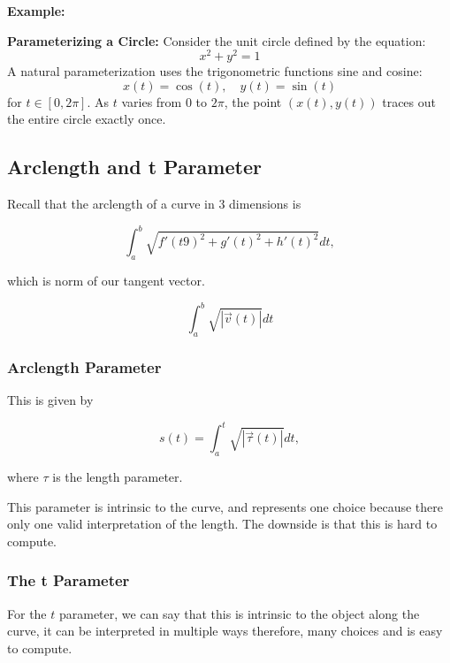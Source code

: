 \textbf{Example:}
\vspace{\baselineskip}

\textbf{Parameterizing a Circle:}  
Consider the unit circle defined by the equation:
\[
x^2 + y^2 = 1
\]
A natural parameterization uses the trigonometric functions sine and cosine:
\[
x(t) = \cos(t), \quad y(t) = \sin(t)
\]
for \( t \in [0, 2\pi] \).  
As \( t \) varies from \( 0 \) to \( 2\pi \), the point \( (x(t), y(t)) \) traces out the entire circle exactly once.

\subsection{Arclength and t Parameter}

Recall that the arclength of a curve in 3 dimensions is

\[
\int_{a}^{b} \sqrt{{f'(t9)}^2 + {g'(t)}^2 + {h'(t)}^2} dt,
\]

which is norm of our tangent vector.

\[
\int_{a}^{b} \sqrt{|\vec{v}(t)|} dt
\]

\subsubsection{Arclength Parameter}

This is given by

\[
s(t) = \int_{a}^{t} \sqrt{|\vec{\tau}(t)|} dt,
\]

where \(\tau\) is the length parameter.
\vspace{\baselineskip}

This parameter is intrinsic to the curve, and represents one choice because there only one valid
interpretation of the length. The downside is that this is hard to compute.

\subsubsection{The t Parameter}

For the \(t\) parameter, we can say that this is intrinsic to the object along the curve,
it can be interpreted in multiple ways therefore, many choices and is easy to compute. 

